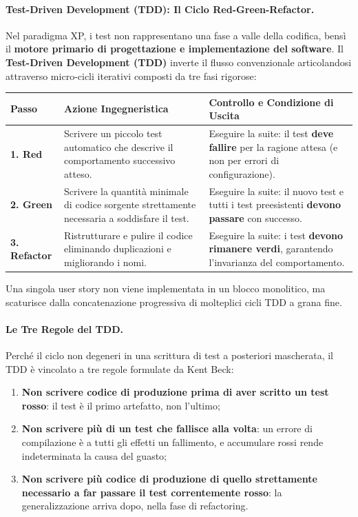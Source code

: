 \documentclass[12pt]{extarticle}
\begin{document}
\paragraph{Test-Driven Development (TDD): Il Ciclo Red-Green-Refactor.}
Nel paradigma XP, i test non rappresentano una fase a valle della codifica, bensì il \textbf{motore primario di progettazione e implementazione del software}. Il \textbf{Test-Driven Development (TDD)} inverte il flusso convenzionale articolandosi attraverso micro-cicli iterativi composti da tre fasi rigorose:

\begin{center}
\small
\begin{tabular}{p{2.2cm}p{6.4cm}p{5.8cm}}
    \toprule
    \textbf{Passo} & \textbf{Azione Ingegneristica} & \textbf{Controllo e Condizione di Uscita} \\
    \midrule
    \textbf{1. Red} & Scrivere un piccolo test automatico che descrive il comportamento successivo atteso. & Eseguire la suite: il test \textbf{deve fallire} per la ragione attesa (e non per errori di configurazione). \\
    \addlinespace
    \textbf{2. Green} & Scrivere la quantità minimale di codice sorgente strettamente necessaria a soddisfare il test. & Eseguire la suite: il nuovo test e tutti i test preesistenti \textbf{devono passare} con successo. \\
    \addlinespace
    \textbf{3. Refactor} & Ristrutturare e pulire il codice eliminando duplicazioni e migliorando i nomi. & Eseguire la suite: i test \textbf{devono rimanere verdi}, garantendo l'invarianza del comportamento. \\
    \bottomrule
\end{tabular}
\end{center}

\noindent Una singola user story non viene implementata in un blocco monolitico, ma scaturisce dalla concatenazione progressiva di molteplici cicli TDD a grana fine.

\paragraph{Le Tre Regole del TDD.}
Perché il ciclo non degeneri in una scrittura di test a posteriori mascherata, il TDD è vincolato a tre regole formulate da Kent Beck:
\begin{enumerate}
    \item \textbf{Non scrivere codice di produzione prima di aver scritto un test rosso}: il test è il primo artefatto, non l'ultimo;
    \item \textbf{Non scrivere più di un test che fallisce alla volta}: un errore di compilazione è a tutti gli effetti un fallimento, e accumulare rossi rende indeterminata la causa del guasto;
    \item \textbf{Non scrivere più codice di produzione di quello strettamente necessario a far passare il test correntemente rosso}: la generalizzazione arriva dopo, nella fase di refactoring.
\end{enumerate}
\end{document}
